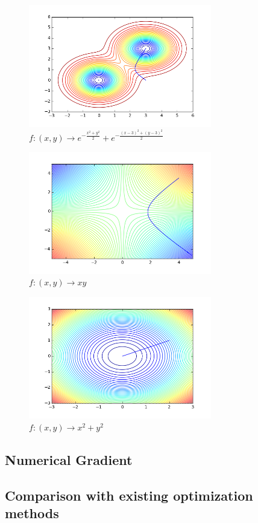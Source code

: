 \begin{figure}[h!]
  \centering
 \includegraphics[width=8cm]{../Figures/Q1/normals.png}
\caption{$f : (x,y) \to e^{-\frac{x^2 + y^2}{2}} + e^{-\frac{(x-3)^2 + (y-3)^2}{2}}$}
\label{wtime}
\end{figure}
\begin{figure}[h!]
  \centering
 \includegraphics[width=8cm]{../Figures/Q1/nonconv.png}
\caption{$f : (x,y) \to xy$}
\label{wtime}
\end{figure}
\begin{figure}[h!]
  \centering
 \includegraphics[width=8cm]{../Figures/Q1/bowl.png}
\caption{$f : (x,y) \to x^2 + y^2$}
\label{wtime}
\end{figure}


\subsection{Numerical Gradient}
\subsection{Comparison with existing optimization methods}
\label{comparison}